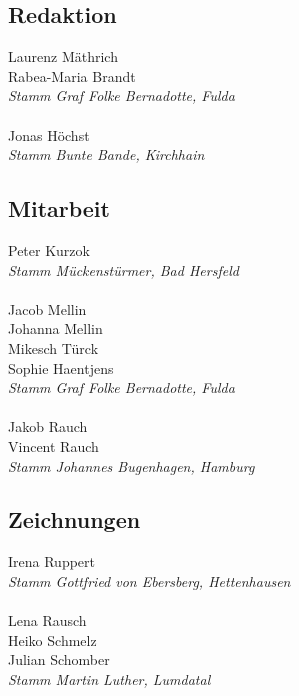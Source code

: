 \begin{centering}
    \begin{multicols}{2}

        \subsection*{Redaktion}
        Laurenz Mäthrich \\ Rabea-Maria Brandt \\ \textit{Stamm Graf Folke Bernadotte, Fulda} \\ ~\\
        Jonas Höchst \\ \textit{Stamm Bunte Bande, Kirchhain} \\

        \subsection*{Mitarbeit}
        Peter Kurzok \\ \textit{Stamm Mückenstürmer, Bad Hersfeld} \\ ~\\
        Jacob Mellin \\ Johanna Mellin \\ Mikesch Türck \\ Sophie Haentjens \\ \textit{Stamm Graf Folke Bernadotte, Fulda} \\ ~\\
        Jakob Rauch \\ Vincent Rauch \\ \textit{Stamm Johannes Bugenhagen, Hamburg} \\

        \vfill\null
        \columnbreak

        \subsection*{Zeichnungen}
        Irena Ruppert \\ \textit{Stamm Gottfried von Ebersberg, Hettenhausen} \\ ~\\

        Lena Rausch \\ Heiko Schmelz \\ Julian Schomber \\
        \textit{Stamm Martin Luther, Lumdatal} \\ ~\\


\end{multicols}
\end{centering}
